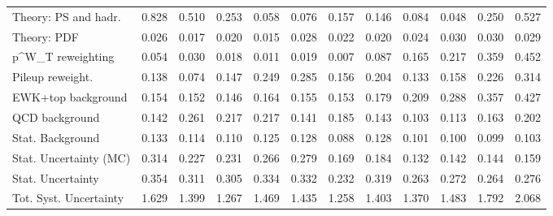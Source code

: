 \begin{tabular}{l|p{0.6cm}p{0.6cm}p{0.6cm}p{0.6cm}p{0.6cm}p{0.6cm}p{0.6cm}p{0.6cm}p{0.6cm}p{0.6cm}p{0.6cm}}
Theory: PS and hadr.                     & 0.828 & 0.510 & 0.253 & 0.058 & 0.076 & 0.157 & 0.146 & 0.084 & 0.048 & 0.250 & 0.527 \\
Theory: PDF                              & 0.026 & 0.017 & 0.020 & 0.015 & 0.028 & 0.022 & 0.020 & 0.024 & 0.030 & 0.030 & 0.029 \\
p^{W}_{T} reweighting                    & 0.054 & 0.030 & 0.018 & 0.011 & 0.019 & 0.007 & 0.087 & 0.165 & 0.217 & 0.359 & 0.452 \\
Pileup reweight.                         & 0.138 & 0.074 & 0.147 & 0.249 & 0.285 & 0.156 & 0.204 & 0.133 & 0.158 & 0.226 & 0.314 \\
EWK+top background                       & 0.154 & 0.152 & 0.146 & 0.164 & 0.155 & 0.153 & 0.179 & 0.209 & 0.288 & 0.357 & 0.427 \\
QCD background                           & 0.142 & 0.261 & 0.217 & 0.217 & 0.141 & 0.185 & 0.143 & 0.103 & 0.113 & 0.163 & 0.202 \\
Stat. Background                         & 0.133 & 0.114 & 0.110 & 0.125 & 0.128 & 0.088 & 0.128 & 0.101 & 0.100 & 0.099 & 0.103 \\
Stat. Uncertainty (MC)                   & 0.314 & 0.227 & 0.231 & 0.266 & 0.279 & 0.169 & 0.184 & 0.132 & 0.142 & 0.144 & 0.159 \\
\hline
Stat. Uncertainty                        & 0.354 & 0.311 & 0.305 & 0.334 & 0.332 & 0.232 & 0.319 & 0.263 & 0.272 & 0.264 & 0.276 \\
\hline
Tot. Syst. Uncertainty                   & 1.629 & 1.399 & 1.267 & 1.469 & 1.435 & 1.258 & 1.403 & 1.370 & 1.483 & 1.792 & 2.068 \\
\hline
\end{tabular}
